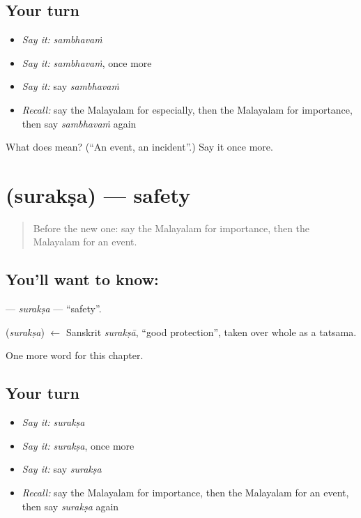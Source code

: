 \subsection*{Your turn}
\begin{itemize}
\raggedright
  \item \emph{Say it:} \emph{sambhavaṁ}
  \item \emph{Say it:} \emph{sambhavaṁ}, once more
  \item \emph{Say it:} say \emph{sambhavaṁ}
  \item \emph{Recall:} say the Malayalam for especially, then the Malayalam for importance, then say \emph{sambhavaṁ} again
\end{itemize}

\begin{tcolorbox}[breakable,colback=teal!4,colframe=teal!35!black,title={Before you move on}]
What does  mean? (\textquotedblleft{}An event, an incident\textquotedblright{}.) Say it once more.
\end{tcolorbox}
\section[\texorpdfstring{\ml{സുരക്ഷ} (surakṣa)}{സുരക്ഷ (surakṣa)}]{ (surakṣa) — safety}

\label{lesson:ML-C282-suraksa}



\begin{quote}
Before the new one: say the Malayalam for importance, then the Malayalam for an event.
\end{quote}

\subsection*{You'll want to know: }
\textbf{} — \emph{surakṣa} — \textquotedblleft{}safety\textquotedblright{}.

\begin{cousinweb}
\textbf{} (\emph{surakṣa}) $\leftarrow$ Sanskrit \emph{surakṣā}, \textquotedblleft{}good protection\textquotedblright{}, taken over whole as a tatsama.
\end{cousinweb}

\begin{grammarlens}[title={What you've built}]
One more word for this chapter.
\end{grammarlens}

\subsection*{Your turn}
\begin{itemize}
\raggedright
  \item \emph{Say it:} \emph{surakṣa}
  \item \emph{Say it:} \emph{surakṣa}, once more
  \item \emph{Say it:} say \emph{surakṣa}
  \item \emph{Recall:} say the Malayalam for importance, then the Malayalam for an event, then say \emph{surakṣa} again
\end{itemize}

